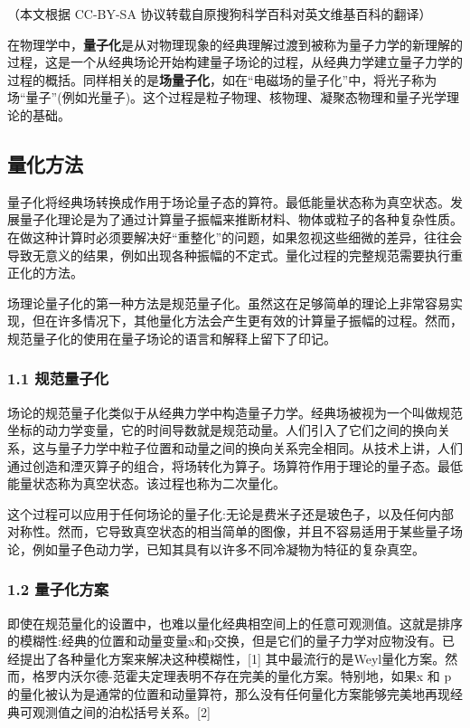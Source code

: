 
（本文根据 CC-BY-SA 协议转载自原搜狗科学百科对英文维基百科的翻译）

在物理学中，\textbf{量子化}是从对物理现象的经典理解过渡到被称为量子力学的新理解的过程，这是一个从经典场论开始构建量子场论的过程，从经典力学建立量子力学的过程的概括。同样相关的是\textbf{场量子化}，如在“电磁场的量子化”中，将光子称为场“量子”(例如光量子)。这个过程是粒子物理、核物理、凝聚态物理和量子光学理论的基础。

\subsection{量化方法}
量子化将经典场转换成作用于场论量子态的算符。最低能量状态称为真空状态。发展量子化理论是为了通过计算量子振幅来推断材料、物体或粒子的各种复杂性质。在做这种计算时必须要解决好“重整化”的问题，如果忽视这些细微的差异，往往会导致无意义的结果，例如出现各种振幅的不定式。量化过程的完整规范需要执行重正化的方法。

场理论量子化的第一种方法是规范量子化。虽然这在足够简单的理论上非常容易实现，但在许多情况下，其他量化方法会产生更有效的计算量子振幅的过程。然而，规范量子化的使用在量子场论的语言和解释上留下了印记。

\subsubsection{1.1 规范量子化}
场论的规范量子化类似于从经典力学中构造量子力学。经典场被视为一个叫做规范坐标的动力学变量，它的时间导数就是规范动量。人们引入了它们之间的换向关系，这与量子力学中粒子位置和动量之间的换向关系完全相同。从技术上讲，人们通过创造和湮灭算子的组合，将场转化为算子。场算符作用于理论的量子态。最低能量状态称为真空状态。该过程也称为二次量化。

这个过程可以应用于任何场论的量子化:无论是费米子还是玻色子，以及任何内部对称性。然而，它导致真空状态的相当简单的图像，并且不容易适用于某些量子场论，例如量子色动力学，已知其具有以许多不同冷凝物为特征的复杂真空。

\subsubsection{1.2 量子化方案}
即使在规范量化的设置中，也难以量化经典相空间上的任意可观测值。这就是排序的模糊性:经典的位置和动量变量x和p交换，但是它们的量子力学对应物没有。已经提出了各种量化方案来解决这种模糊性，[1] 其中最流行的是Weyl量化方案。然而，格罗内沃尔德-范霍夫定理表明不存在完美的量化方案。特别地，如果x 和 p的量化被认为是通常的位置和动量算符，那么没有任何量化方案能够完美地再现经典可观测值之间的泊松括号关系。[2]

